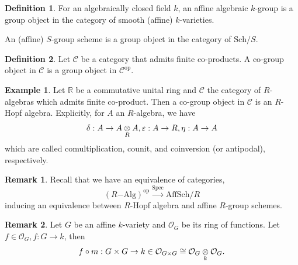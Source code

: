 \documentclass[10pt]{article}
\numberwithin{equation}{section}
\theoremstyle{definition}
\newtheorem{definition}{Definition}[section]
\newtheorem{remark}{Remark}[section]
\newtheorem{example}{Example}[section]
\DeclareMathOperator{\Spec}{Spec}
\newcommand{\R}[0]{\mathbb{R}}
\newcommand{\sC}[0]{\mathscr{C}}
\newcommand{\op}[0]{\mathrm{op}}
\newcommand{\cO}[0]{\mathcal{O}}
\newcommand{\tens}[1]{%
  \mathbin{\mathop{\otimes}\displaylimits_{#1}}%
}
\begin{document}
\begin{definition}
    \label{definition_1_4}
    For an algebraically closed field $k$, an affine algebraic $k$-group is a group object in the category of smooth (affine) $k$-varieties. 
    \par An (affine) $S$-group scheme is a group object in the category of $\mathrm{Sch}/S$.
\end{definition}

\begin{definition}
    \label{definition_1_5}
    Let $\sC$ be a category that admits finite co-products. A co-group object in $\sC$ is a group object in $\sC^\op$.
\end{definition}
\begin{example}
    Let $\R$ be a commutative unital ring and $\sC$ the category of $R$-algebras which admits finite co-product. Then a co-group object in $\sC$ is an $R$-Hopf algebra. Explicitly, for $A$ an $R$-algebra, we have
    \begin{equation*}
        \delta:A\to A\tens{R}A, \varepsilon:A\to R, \eta:A\to A
    \end{equation*}
    which are called comultiplication, counit, and coinversion (or antipodal), respectively.
\end{example}
\begin{remark}
    Recall that we have an equivalence of categories,
    \begin{equation*}
        (R\mathrm{-Alg})^{\op}\stackrel{\Spec}{\to}\mathrm{AffSch}/R
    \end{equation*}
    inducing an equivalence between $R$-Hopf algebra and affine $R$-group schemes.
\end{remark}

\begin{remark}
    Let $G$ be an affine $k$-variety and $\cO_G$ be its ring of functions. Let $f\in\cO_G,f:G\to k$, then 
    \begin{equation*}
        f\circ m: G\times G\to k\in\cO_{G\times G}\cong \cO_G\tens{k}\cO_G.
    \end{equation*}
\end{remark}
\end{document}
